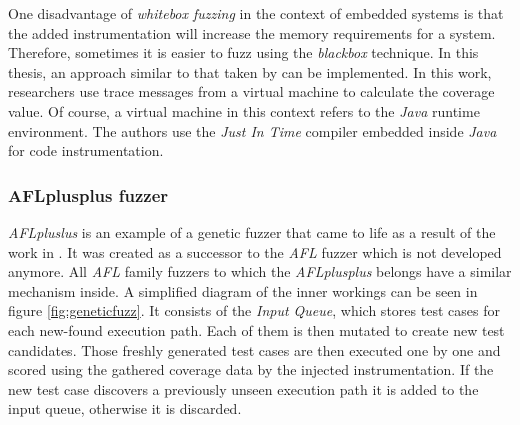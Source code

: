 One disadvantage of \textit{whitebox fuzzing} in the context of embedded systems is that the added instrumentation will increase the memory requirements for a system. Therefore, sometimes it is easier to fuzz using the \textit{blackbox} technique. In this thesis, an approach similar to that taken by \cite{tracecoverage} can be implemented. In this work, researchers use trace messages from a virtual machine to calculate the coverage value. Of course, a virtual machine in this context refers to the \textit{Java} runtime environment. The authors use the \textit{Just In Time} compiler embedded inside \textit{Java} for code instrumentation.

\subsubsection{AFLplusplus fuzzer} \label{sec:afl}

\textit{AFLpluslus} is an example of a genetic fuzzer that came to life as a result of the work in \cite{AFLplusplus-Woot20}. It was created as a successor to the \textit{AFL} fuzzer which is not developed anymore. All \textit{AFL} family fuzzers to which the \textit{AFLplusplus} belongs have a similar mechanism inside. A simplified diagram of the inner workings can be seen in figure \ref{fig:geneticfuzz}. It consists of the \textit{Input Queue}, which stores test cases for each new-found execution path. Each of them is then mutated to create new test candidates. Those freshly generated test cases are then executed one by one and scored using the gathered coverage data by the injected instrumentation. If the new test case discovers a previously unseen execution path it is added to the input queue, otherwise it is discarded.


